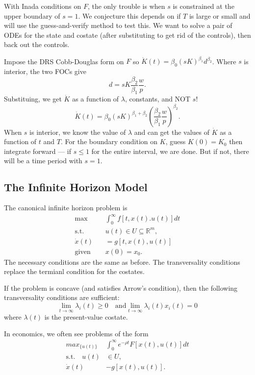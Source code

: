 \documentclass{tufte-handout}
\newcommand*\R{\mathbb{R}}
\theoremstyle{definition}
\begin{document}
With Inada conditions on $F$, the only trouble is when $s$ is constrained at the upper boundary of $s = 1$. We conjecture this depends on if $T$ is large or small and will use the guess-and-verify method to test this. We want to solve a pair of ODEs for the state and costate (after substituting to get rid of the controls), then back out the controls.

Impose the DRS Cobb-Douglas form on $F$ so $\dot{K}(t) = \beta_0 \left( sK \right)^{\beta_1} d^{\beta_2}$. Where $s$ is interior, the two FOCs give \[
	d = sK \frac{\beta_2}{\beta_1}\frac{w}{p}.
\] Substituing, we get $\dot{K}$ as a function of $\lambda$, constants, and NOT $s$! \[
	\dot{K}(t) = \beta_0 (sK)^{\beta_1 + \beta_2} \left( \frac{\beta_2}{\beta_1}\frac{w}{p} \right)^{\beta_2}
.\] When $s$ is interior, we know the value of $\lambda$ and can get the values of $\dot{K}$ as a function of $t$ and $T$. For the boundary condition on $K$, guess $K(0) = K_0$ then integrate forward --- if $s \le 1$ for the entire interval, we are done. But if not, there will be a time period with $s=1$.

\subsection{The Infinite Horizon Model}

The canonical infinite horizon problem is
\begin{align*}
	\max &\int_{0}^{\infty} f[t,x(t).u(t)] dt  \\
	\text{s.t.} \quad &u(t) \in U \subseteq \R^m, \\
	\dot{x}(t) &= g[t,x(t),u(t)]  \\
	\text{given } \quad &x(0) = x_0
.\end{align*}	
The necessary conditions are the same as before. The transversality conditions replace the termianl condition for the costates.

If the problem is concave (and satisfies Arrow's condition), then the following transversality conditions are sufficient: \[
	\lim\limits_{t \to \infty} \lambda_i(t) \ge 0 \quad \text{and} \lim\limits_{t \to \infty} \lambda_i(t)x_i(t) = 0
\] where $\lambda(t)$ is the present-value costate.

In economics, we often see problems of the form
\begin{align*}
	max_{\{u(t)\}} &\int_{0}^{\infty} e^{-\rho t} F[x(t), u(t)] dt  \\
	\text{s.t.} \quad u(t) &\in U, \\
	\dot{x}(t) &- g[x(t), u(t)]
.\end{align*}
\end{document}

